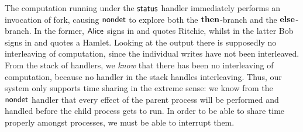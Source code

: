 \documentclass[12pt,phd,lfcs,twoside,openright,logo,leftchapter,normalheadings]{infthesis}
\theoremstyle{plain}
\theoremstyle{definition}
\begin{document}
%
The computation running under the $\mathsf{status}$ handler immediately
performs an invocation of fork, causing $\mathsf{nondet}$ to explore both the
$\mathbf{then}$-branch and the $\mathbf{else}$-branch. In the former, $\mathsf{Alice}$ signs
in and quotes Ritchie, whilst in the latter Bob signs in and quotes a
Hamlet.
%
Looking at the output there is supposedly no interleaving of
computation, since the individual writes have not been
interleaved. From the stack of handlers, we \emph{know} that there has
been no interleaving of computation, because no handler in the stack
handles interleaving. Thus, our system only supports time sharing in
the extreme sense: we know from the $\mathsf{nondet}$ handler that every
effect of the parent process will be performed and handled before the
child process gets to run. In order to be able to share time properly
amongst processes, we must be able to interrupt them.
\end{document}
